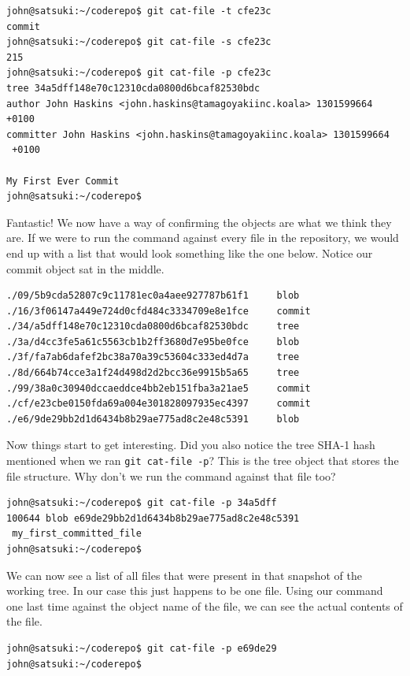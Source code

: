 \begin{Verbatim}
john@satsuki:~/coderepo$ git cat-file -t cfe23c
commit
john@satsuki:~/coderepo$ git cat-file -s cfe23c
215
john@satsuki:~/coderepo$ git cat-file -p cfe23c
tree 34a5dff148e70c12310cda0800d6bcaf82530bdc
author John Haskins <john.haskins@tamagoyakiinc.koala> 1301599664 +0100
committer John Haskins <john.haskins@tamagoyakiinc.koala> 1301599664 
 +0100

My First Ever Commit
john@satsuki:~/coderepo$ 
\end{Verbatim}

Fantastic!  We now have a way of confirming the objects are what we think they are.  If we were to run the command against every file in the repository, we would end up with a list that would look something like the one below.  Notice our commit object sat in the middle.

\begin{Verbatim}
./09/5b9cda52807c9c11781ec0a4aee927787b61f1     blob
./16/3f06147a449e724d0cfd484c3334709e8e1fce     commit
./34/a5dff148e70c12310cda0800d6bcaf82530bdc     tree
./3a/d4cc3fe5a61c5563cb1b2ff3680d7e95be0fce     blob
./3f/fa7ab6dafef2bc38a70a39c53604c333ed4d7a     tree
./8d/664b74cce3a1f24d498d2d2bcc36e9915b5a65     tree
./99/38a0c30940dccaeddce4bb2eb151fba3a21ae5     commit
./cf/e23cbe0150fda69a004e301828097935ec4397     commit
./e6/9de29bb2d1d6434b8b29ae775ad8c2e48c5391     blob
\end{Verbatim}

Now things start to get interesting.  Did you also notice the tree SHA-1 hash mentioned when we ran \texttt{git cat-file -p}?  This is the tree object that stores the file structure.  Why don't we run the command against that file too?

\begin{Verbatim}
john@satsuki:~/coderepo$ git cat-file -p 34a5dff
100644 blob e69de29bb2d1d6434b8b29ae775ad8c2e48c5391	
 my_first_committed_file
john@satsuki:~/coderepo$ 
\end{Verbatim}

We can now see a list of all files that were present in that snapshot of the working tree.  In our case this just happens to be one file.  Using our command one last time against the object name of the file, we can see the actual contents of the file.

\begin{Verbatim}
john@satsuki:~/coderepo$ git cat-file -p e69de29
john@satsuki:~/coderepo$ 
\end{Verbatim}

